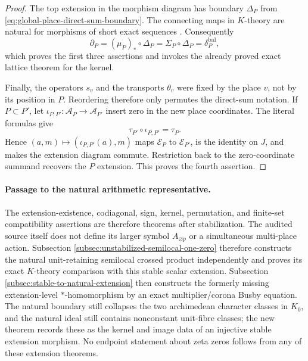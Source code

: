 \begin{proof}
The top extension in the morphism diagram has boundary
$\Delta_P$ from \eqref{eq:global-place-direct-sum-boundary}.  The connecting
maps in $K$-theory are natural for morphisms of short exact sequences
\cite[Definition~21.1.1 and Example~21.1.2(a), pp.~266, 268]{blackadar1986}.
Consequently
\[
 \partial_P=(\mu_P)_*\circ\Delta_P
 =\Sigma_P\circ\Delta_P=\delta_P^{\mathrm{bal}},
\]
which proves the first three assertions and invokes the already proved exact
lattice theorem for the kernel.

Finally, the operators $s_v$ and the transports $\theta_v$ were fixed by the
place $v$, not by its position in $P$.  Reordering therefore only permutes the
direct-sum notation.  If $P\subset P'$, let
$\iota_{P,P'}:\mathcal A_P\to\mathcal A_{P'}$ insert zero in the new place
coordinates.  The literal formulas give
\[
 \tau_{P'}\circ\iota_{P,P'}=\tau_P.
\]
Hence $(a,m)\mapsto(\iota_{P,P'}(a),m)$ maps
$\mathcal E_P$ to $\mathcal E_{P'}$, is the identity on $J$, and makes the
extension diagram commute.  Restriction back to the zero-coordinate summand
recovers the $P$ extension.  This proves the fourth assertion.
\end{proof}

\paragraph{Passage to the natural arithmetic representative.}
The extension-existence, codiagonal, sign, kernel, permutation, and finite-set
compatibility assertions are therefore theorems after stabilization.  The
audited source itself does not define its larger symbol $A_{\varnothing p}$ or
a simultaneous multi-place action.  Subsection
\ref{subsec:unstabilized-semilocal-one-zero} therefore constructs the natural
unit-retaining semilocal crossed product independently and proves its exact
$K$-theory comparison with this stable scalar extension.  Subsection
\ref{subsec:stable-to-natural-extension} then constructs the formerly missing
extension-level $*$-homomorphism by an exact multiplier/corona Busby equation.
The natural boundary still collapses the two archimedean character classes in
$K_0$, and the natural ideal still contains nonconstant unit-fibre classes;
the new theorem records these as the kernel and image data of an injective
stable extension morphism.  No endpoint statement about zeta zeros follows
from any of these extension theorems.

